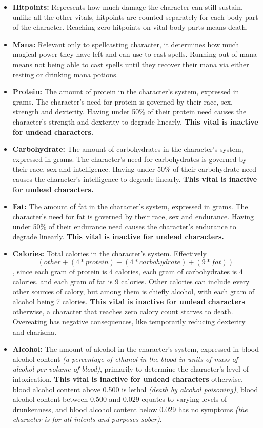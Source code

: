 \documentclass[openany,11pt,a4paper]{book}
\begin{document}
\begin{itemize}
\item \textbf{Hitpoints:} Represents how much damage the character can still sustain, unlike all the other vitals, hitpoints are counted separately for each body part of the character. Reaching zero hitpoints on vital body parts means death.
\item \textbf{Mana:} Relevant only to spellcasting character, it determines how much magical power they have left and can use to cast spells. Running out of mana means not being able to cast spells until they recover their mana via either resting or drinking mana potions.
\item \textbf{Protein:} The amount of protein in the character's system, expressed in grams. The character's need for protein is governed by their race, sex, strength and dexterity. Having under 50\% of their protein need causes the character's strength and dexterity to degrade linearly. \textbf{This vital is inactive for undead characters.}
\item \textbf{Carbohydrate:} The amount of carbohydrates in the character's system, expressed in grams. The character's need for carbohydrates is governed by their race, sex and intelligence. Having under 50\% of their carbohydrate need causes the character's intelligence to degrade linearly. \textbf{This vital is inactive for undead characters.}
\item \textbf{Fat:} The amount of fat in the character's system, expressed in grams. The character's need for fat is governed by their race, sex and endurance. Having under 50\% of their endurance need causes the character's endurance to degrade linearly. \textbf{This vital is inactive for undead characters.}
\item \textbf{Calories:} Total calories in the character's system. Effectively \[(other+(4*protein)+(4*carbohydrate)+(9*fat))\], since each gram of protein is 4 calories, each gram of carbohydrates is 4 calories, and each gram of fat is 9 calories. Other calories can include every other sources of calory, but among them is chiefly alcohol, with each gram of alcohol being 7 calories. \textbf{This vital is inactive for undead characters} \textemdash otherwise, a character that reaches zero calory count starves to death. Overeating has negative consequences, like temporarily reducing dexterity and charisma.
\item \textbf{Alcohol:} The amount of alcohol in the character's system, expressed in blood alcohol content \textit{(a percentage of ethanol in the blood in units of mass of alcohol per volume of blood)}, primarily to determine the character's level of intoxication. \textbf{This vital is inactive for undead characters} \textemdash otherwise, blood alcohol content above 0.500 is lethal \textit{(death by alcohol poisoning)}, blood alcohol content between 0.500 and 0.029 equates to varying levels of drunkenness, and blood alcohol content below 0.029 has no symptoms \textit{(the character is for all intents and purposes sober)}.

\end{itemize}
\end{document}
